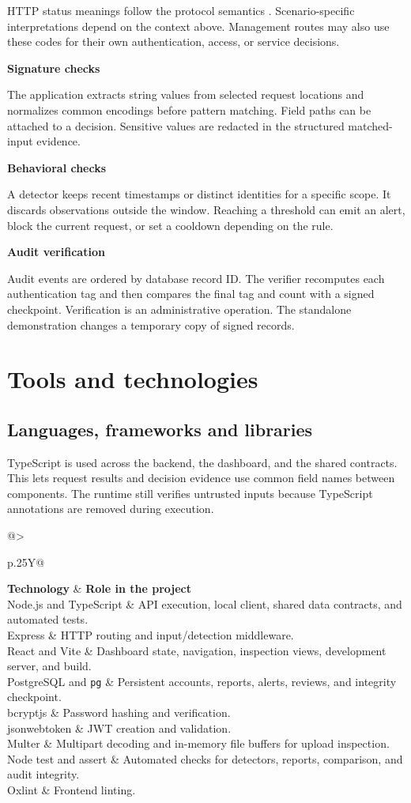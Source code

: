 \documentclass[11pt,a4paper,oneside]{report}
\makeatletter
\newcommand{\topic}[1]{\par\addvspace{4pt}\noindent\textbf{#1}\par\nobreak\vspace{-.20em}}
\newcommand{\casecode}[1]{\texttt{#1}}
\newcommand{\tabletitle}[1]{\par\addvspace{6pt}\noindent\parbox{\linewidth}{\captionof{table}{#1}}\par\nobreak}
\newcommand{\bodytable}[1]{\begin{tabularx}{\linewidth}{@{}>{\raggedright\arraybackslash}p{.25\linewidth}Y@{}}\toprule #1\bottomrule\end{tabularx}}
\makeatother
\begin{document}
HTTP status meanings follow the protocol semantics \cite{http,rfc429}. Scenario-specific interpretations depend on the context above. Management routes may also use these codes for their own authentication, access, or service decisions.

\topic{Signature checks}
The application extracts string values from selected request locations and normalizes common encodings before pattern matching. Field paths can be attached to a decision. Sensitive values are redacted in the structured matched-input evidence.

\topic{Behavioral checks}
A detector keeps recent timestamps or distinct identities for a specific scope. It discards observations outside the window. Reaching a threshold can emit an alert, block the current request, or set a cooldown depending on the rule.

\topic{Audit verification}
Audit events are ordered by database record ID. The verifier recomputes each authentication tag and then compares the final tag and count with a signed checkpoint. Verification is an administrative operation. The standalone demonstration changes a temporary copy of signed records.

\chapter{Tools and technologies}
\section{Languages, frameworks and libraries}
TypeScript is used across the backend, the dashboard, and the shared contracts. This lets request results and decision evidence use common field names between components. The runtime still verifies untrusted inputs because TypeScript annotations are removed during execution.

\tabletitle{Technologies and their roles}
\bodytable{\textbf{Technology} & \textbf{Role in the project}\\\midrule
Node.js and TypeScript & API execution, local client, shared data contracts, and automated tests.\\
Express & HTTP routing and input/detection middleware.\\
React and Vite & Dashboard state, navigation, inspection views, development server, and build.\\
PostgreSQL and \casecode{pg} & Persistent accounts, reports, alerts, reviews, and integrity checkpoint.\\
bcryptjs & Password hashing and verification.\\
jsonwebtoken & JWT creation and validation.\\
Multer & Multipart decoding and in-memory file buffers for upload inspection.\\
Node test and assert & Automated checks for detectors, reports, comparison, and audit integrity.\\
Oxlint & Frontend linting.\\}
\end{document}
